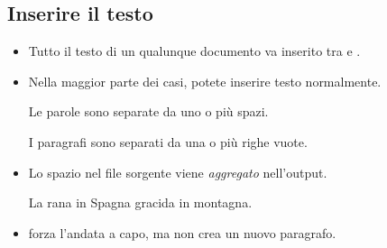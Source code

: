 \documentclass{beamer}
\begin{document}
\subsection{Inserire il testo}
\begin{frame}[fragile]{\insertsubsection{}}
\small
\begin{itemize}
\item Tutto il testo di un qualunque documento va inserito tra 
e .
\item Nella maggior parte dei casi, potete inserire testo normalmente.
\begin{exampletwouptiny}
Le parole sono separate da uno
o pi\`u spazi.

I paragrafi sono separati da una
o pi\`u righe vuote.
\end{exampletwouptiny}
\item Lo spazio nel file sorgente viene \emph{aggregato} nell'output.
\begin{exampletwouptiny}
La   rana       in Spagna
gracida in		 montagna.
\end{exampletwouptiny}
\item \keystrokebftt{\bs}\keystrokebftt{\bs} forza l'andata a capo, ma non crea un nuovo paragrafo.
\end{itemize}
\end{frame}
\end{document}
